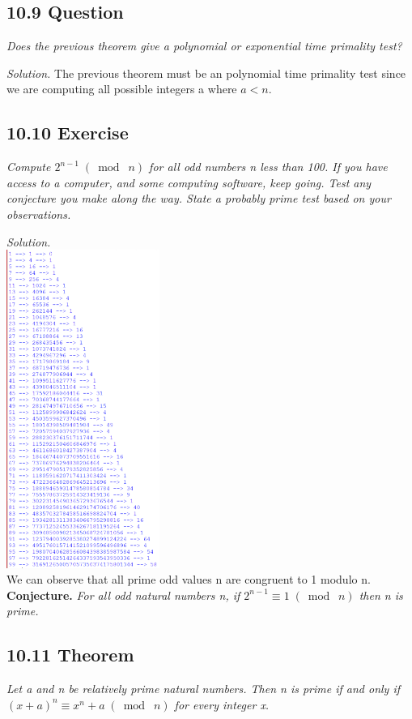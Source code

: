 \documentclass{article}
\begin{document}
\subsection*{10.9 Question} 
\quad \textit{Does the previous theorem give a polynomial or exponential time primality test?}

\textit{Solution.} The previous theorem must be an polynomial time primality test since we are computing all possible integers a where $a < n$.

\subsection*{10.10 Exercise} 
\quad \textit{Compute $2^{n-1} \;(\bmod\; n)$ for all odd numbers n less than 100. If you have access to a computer, and some computing software, keep going. Test any conjecture you make along the way. State a probably prime test based on your observations.}

\textit{Solution.}\\
\includegraphics[width=5cm]{odds.PNG}\\
We can observe that all prime odd values n are congruent to 1 modulo n.\\
\textbf{Conjecture.} \textit{For all odd natural numbers n, if $2^{n-1} \equiv 1 \;(\bmod\; n)$ then n is prime.}
\subsection*{10.11 Theorem} 
\quad \textit{Let a and n be relatively prime natural numbers. Then n is prime if and only if $(x+a)^n \equiv x^n+a \;(\bmod\; n)$ for every integer x.}
\end{document}
